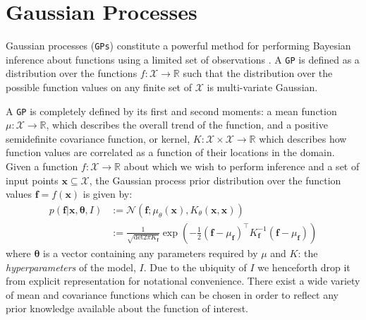 \documentclass{article}
\begin{document}
\section{Gaussian Processes}

Gaussian processes (\verb"GPs") constitute a powerful method for performing Bayesian inference about functions using a limited set of observations \cite{rassandwill}. A \verb"GP" is defined as a distribution over the functions $f : \mathcal{X} \rightarrow \mathbb{R}$ such that the distribution over the possible function values on any finite set of $\mathcal{X}$ is multi-variate Gaussian.

A \verb"GP" is completely defined by its first and second moments: a mean function $\mu : \mathcal{X} \rightarrow \mathbb{R}$, which describes the overall trend of the function, and a positive semidefinite covariance function, or kernel, $K : \mathcal{X} \times \mathcal{X} \rightarrow \mathbb{R}$ which describes how function values are correlated as a function of their locations in the domain. Given a function $f : \mathcal{X} \rightarrow \mathbb{R}$ about which we wish to perform inference and a set of input points $\mathbf{x} \subseteq \mathcal{X}$, the Gaussian process prior distribution over the function values $\mathbf{f} = f(\mathbf{x})$ is given by:
\begin{align}
p(\mathbf{f} | \mathbf{x},\bm{\theta},I) &:= \mathcal{N}\left( \mathbf{f};\mu_\theta(\mathbf{x}),K_\theta(\mathbf{x},\mathbf{x}) \right) \nonumber \\
&:= \frac{1}{\sqrt{\mathrm{det} 2 \pi K_{\mathbf{f}}} } \exp \left( - \frac{1}{2} (\mathbf{f}-\mu_{\mathbf{f}})^\top K_\mathbf{f}^{-1} (\mathbf{f}-\mu_{\mathbf{f}})  \right)
\end{align}
where $\bm{\theta}$ is a vector containing any parameters required by $\mu$ and $K$: the \emph{hyperparameters} of the model, $I$. Due to the ubiquity of $I$ we henceforth drop it from explicit representation for notational convenience. %
There exist a wide variety of mean and covariance functions which can be chosen in order to reflect any prior knowledge available about the function of interest. 
\end{document}
